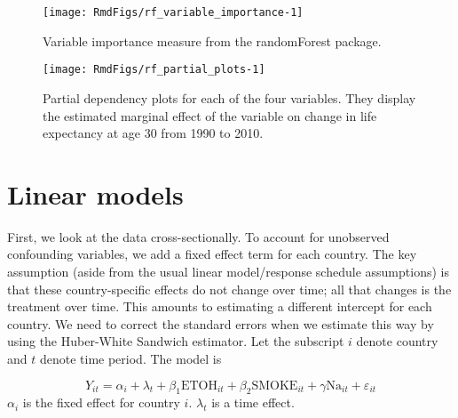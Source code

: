 \documentclass[11pt]{article}\usepackage[]{graphicx}\usepackage[]{color}
\makeatletter
\def\maxwidth{ %
  \ifdim\Gin@nat@width>\linewidth
    \linewidth
  \else
    \Gin@nat@width
  \fi
}
\newenvironment{knitrout}{}{} %
\newcommand{\eps}{\varepsilon}
\makeatother
\begin{document}
\begin{knitrout}
\color{fgcolor}\begin{figure}

{\centering \texttt{[image: RmdFigs/rf\_variable\_importance-1]} 

}

\caption[Variable importance measure from the randomForest package]{Variable importance measure from the randomForest package.}\label{fig:rf_variable_importance}
\end{figure}


\end{knitrout}
\begin{knitrout}
\color{fgcolor}\begin{figure}

{\centering \texttt{[image: RmdFigs/rf\_partial\_plots-1]} 

}

\caption[Partial dependency plots for each of the four variables]{Partial dependency plots for each of the four variables. They display the estimated marginal effect of the variable on change in life expectancy at age 30 from 1990 to 2010.}\label{fig:rf_partial_plots}
\end{figure}


\end{knitrout}

\newpage

\section{Linear models}


First, we look at the data cross-sectionally.
To account for unobserved confounding variables, we add a fixed effect term for each country.
The key assumption (aside from the usual linear model/response schedule assumptions) is that these country-specific effects do not change over time; all that changes is the treatment over time.
This amounts to estimating a different intercept for each country.
We need to correct the standard errors when we estimate this way by using the Huber-White Sandwich estimator.
Let the subscript $i$ denote country and $t$ denote time period.
The model is

$$Y_{it} = \alpha_i + \lambda_t + \beta_1\text{ETOH}_{it} +  \beta_2\text{SMOKE}_{it} + \gamma\text{Na}_{it} + \eps_{it}$$
$\alpha_i$ is the fixed effect for country $i$.
$\lambda_t$ is a time effect.
\end{document}
